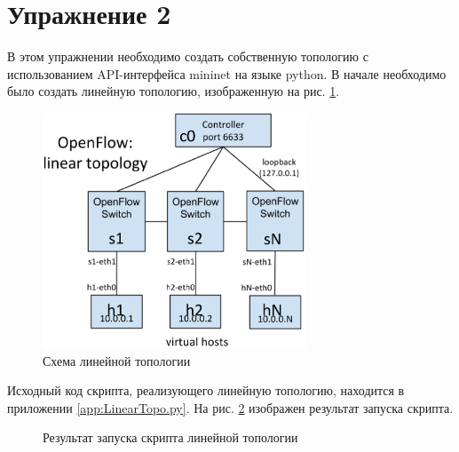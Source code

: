 \documentclass[a4paper, 14pt]{extarticle}
\begin{document}
\section*{Упражнение 2}

В этом упражнении необходимо создать собственную топологию с использованием
API-интерфейса mininet на языке python. В начале необходимо было создать
линейную топологию, изображенную на рис. \ref{fig:linear-topology}.

\begin{figure}[H]
  \centering
  \includegraphics[width=0.7\textwidth]{images/linear-topology.png}
  \caption{Схема линейной топологии}
  \label{fig:linear-topology}
\end{figure}

Исходный код скрипта, реализующего линейную топологию, находится в приложении
\ref{app:LinearTopo.py}. На рис. \ref{fig:linear-py} изображен результат запуска
скрипта.

\begin{figure}[H]
  \centering
  \caption{Результат запуска скрипта линейной топологии}
  \label{fig:linear-py}
\end{figure}
\end{document}
